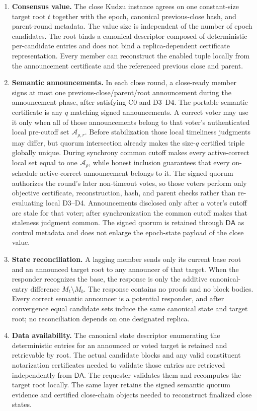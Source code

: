 \documentclass[11pt]{article}
\theoremstyle{definition}
\theoremstyle{remark}
\newcommand{\DA}{\mathsf{DA}}
\begin{document}
\begin{enumerate}[leftmargin=2.0em]
  \item \textbf{Consensus value.} The close Kudzu instance agrees on one constant-size target root $t$ together with the epoch, canonical previous-close hash, and parent-round metadata. The value size is independent of the number of epoch candidates. The root binds a canonical descriptor composed of deterministic per-candidate entries and does not bind a replica-dependent certificate representation. Every member can reconstruct the enabled tuple locally from the announcement certificate and the referenced previous close and parent.

  \item \textbf{Semantic announcements.} In each close round, a close-ready member signs at most one previous-close/parent/root announcement during the announcement phase, after satisfying C0 and D3--D4. The portable semantic certificate is any $q$ matching signed announcements. A correct voter may use it only when all of those announcements belong to that voter's authenticated local pre-cutoff set $\mathcal A_{\rho,r}$. Before stabilization those local timeliness judgments may differ, but quorum intersection already makes the size-$q$ certified triple globally unique. During synchrony common cutoff makes every active-correct local set equal to one $\mathcal A_\rho$, while honest inclusion guarantees that every on-schedule active-correct announcement belongs to it. The signed quorum authorizes the round's later non-timeout votes, so those voters perform only objective certificate, reconstruction, hash, and parent checks rather than re-evaluating local D3--D4. Announcements disclosed only after a voter's cutoff are stale for that voter; after synchronization the common cutoff makes that staleness judgment common. The signed quorum is retained through $\DA$ as control metadata and does not enlarge the epoch-state payload of the close value.

  \item \textbf{State reconciliation.} A lagging member sends only its current base root and an announced target root to any announcer of that target. When the responder recognizes the base, the response is only the additive canonical-entry difference $M_t\setminus M_b$. The response contains no proofs and no block bodies. Every correct semantic announcer is a potential responder, and after convergence equal candidate sets induce the same canonical state and target root; no reconciliation depends on one designated replica.

  \item \textbf{Data availability.} The canonical state descriptor enumerating the deterministic entries for an announced or voted target is retained and retrievable by root. The actual candidate blocks and any valid constituent notarization certificates needed to validate those entries are retrieved independently from $\DA$. The requester validates them and recomputes the target root locally. The same layer retains the signed semantic quorum evidence and certified close-chain objects needed to reconstruct finalized close states.
\end{enumerate}
\end{document}
